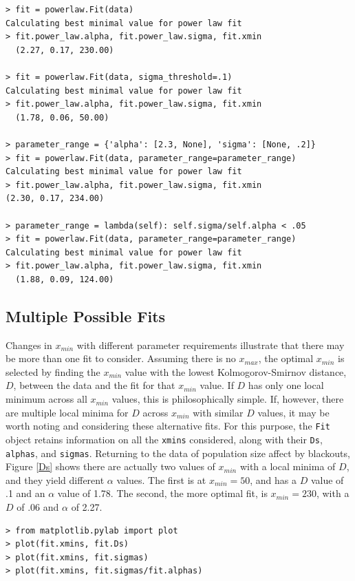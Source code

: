 \documentclass[10pt]{article}
\begin{document}
\begin{verbatim}
> fit = powerlaw.Fit(data)
Calculating best minimal value for power law fit
> fit.power_law.alpha, fit.power_law.sigma, fit.xmin
  (2.27, 0.17, 230.00)
  
> fit = powerlaw.Fit(data, sigma_threshold=.1)
Calculating best minimal value for power law fit
> fit.power_law.alpha, fit.power_law.sigma, fit.xmin
  (1.78, 0.06, 50.00)

> parameter_range = {'alpha': [2.3, None], 'sigma': [None, .2]}
> fit = powerlaw.Fit(data, parameter_range=parameter_range)
Calculating best minimal value for power law fit
> fit.power_law.alpha, fit.power_law.sigma, fit.xmin
(2.30, 0.17, 234.00)

> parameter_range = lambda(self): self.sigma/self.alpha < .05
> fit = powerlaw.Fit(data, parameter_range=parameter_range)
Calculating best minimal value for power law fit
> fit.power_law.alpha, fit.power_law.sigma, fit.xmin
  (1.88, 0.09, 124.00)  
\end{verbatim}

\subsection*{Multiple Possible Fits}
Changes in $x_{min}$ with different parameter requirements illustrate that there may be more than one fit to consider. Assuming there is no $x_{max}$, the optimal $x_{min}$ is selected by finding the $x_{min}$ value with the lowest Kolmogorov-Smirnov distance, $D$, between the data and the fit for that $x_{min}$ value. If $D$ has only one local minimum across all $x_{min}$ values, this is philosophically simple. If, however, there are multiple local minima for $D$ across $x_{min}$ with similar $D$ values, it may be worth noting and considering these alternative fits. For this purpose, the \verb$Fit$ object retains information on all the \verb$xmins$ considered, along with their \verb$Ds$, \verb$alphas$, and \verb$sigmas$. Returning to the data of population size affect by blackouts, Figure \ref{Ds} shows there are actually two values of $x_{min}$ with a local minima of $D$, and they yield different $\alpha$ values. The first is at $x_{min}=50$, and has a $D$ value of .1 and an $\alpha$ value of 1.78. The second, the more optimal fit, is $x_{min}=230$, with a $D$ of .06 and $\alpha$ of 2.27.

\begin{verbatim}
> from matplotlib.pylab import plot
> plot(fit.xmins, fit.Ds)
> plot(fit.xmins, fit.sigmas)
> plot(fit.xmins, fit.sigmas/fit.alphas)
\end{verbatim}
\end{document}
